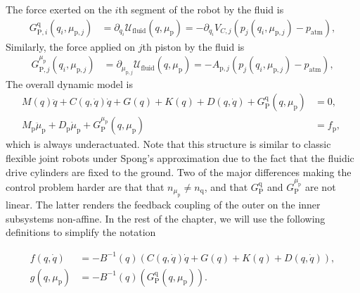 The force exerted on the $i$th segment of the robot by the fluid is 
%
\begin{equation}\label{eq:backstepping:GPq}
\begin{split}
    G_{\mathrm{P},i}^{\mathrm{q}}(q_i,\mu_{\mathrm{p},j}) &= \partial_{q_i} \mathcal{U}_\mathrm{fluid}(q,\mu_\mathrm{p}) = -\partial_{q_i} V_{C,j} \left ( p_{j}(q_i, \mu_{\mathrm{p},j}) - p_\mathrm{atm} \right ), 
\end{split}
\end{equation}
Similarly, the force applied on $j$th piston by the fluid is
%
\begin{equation}\label{eq:backstepping:GPmu}
\begin{split}
    G_{\mathrm{P},j}^{\mu_\mathrm{p}}(q_i,\mu_{\mathrm{p},j}) &= \partial_{\mu_{\mathrm{p},j}} \mathcal{U}_\mathrm{fluid}(q,\mu_\mathrm{p}) = - A_{\mathrm{p},j} \left ( p_{j}(q_i, \mu_{\mathrm{p},j}) - p_\mathrm{atm} \right ), 
\end{split}
\end{equation}
%
The overall dynamic model is
%
\begin{equation}\label{eq:backstepping:complete_dyn} %
\begin{split}
	M(q)\ddot{q} \!+\! C(q,\dot{q})\dot{q} \!+\! G(q) \!+\! K(q) \!+\! D(q,\dot{q}) \!+\! G_{\mathrm{P}}^{\mathrm{q}}(q,\mu_\mathrm{p}) &= 0, \\
	M_\mathrm{p} \ddot{\mu}_\mathrm{p} + D_\mathrm{p} \dot{\mu}_\mathrm{p} + G_{\mathrm{P}}^{\mu_\mathrm{p}}(q,\mu_\mathrm{p}) &= f_\mathrm{p}, \; 
\end{split}
\end{equation}
which is always underactuated.
%
Note that this structure is similar to classic flexible joint robots under Spong's approximation \citep{della2021flexible} due to the fact that the fluidic drive cylinders are fixed to the ground. Two of the major differences making the control problem harder are that that $n_{\mu_\mathrm{p}} \neq n_{\mathrm{q}}$, and that $G_{\mathrm{P}}^{\mathrm{q}}$ and $G_{\mathrm{P}}^{\mu_\mathrm{p}}$ are not linear.
The latter renders the feedback coupling of the outer on the inner subsystems non-affine.
%
In the rest of the chapter, we will use the following definitions to simplify the notation
%
\begin{small}
\begin{equation}\label{eq:backstepping:gf}
\begin{split}
	f(q,\dot{q}) &= - B^{-1}(q)\left(C(q,\dot{q})\dot{q} + G(q) + K(q) + D(q, \dot{q}) \right), \\
	g(q,\mu_\mathrm{p}) &= - B^{-1}(q) \left ( G_{\mathrm{P}}^{\mathrm{q}}(q,\mu_\mathrm{p}) \right ).
\end{split}
\end{equation}
\end{small}